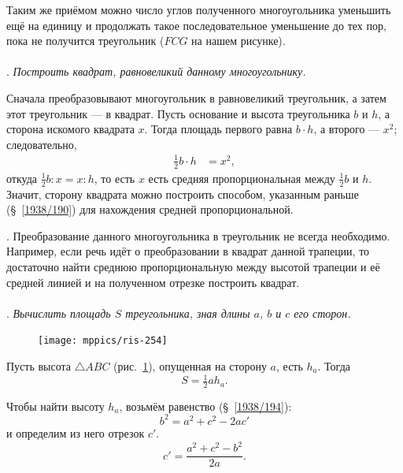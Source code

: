 \documentclass[oneside]{book}
\begin{document}
Таким же приёмом можно число углов полученного многоугольника уменьшить ещё на единицу и продолжать такое последовательное уменьшение до тех пор, пока не получится треугольник ($FCG$ на нашем рисунке).

\paragraph{}\label{1938/255}
.
\emph{Построить квадрат, равновеликий данному многоугольнику.}

Сначала преобразовывают многоугольник в равновеликий треугольник, а затем этот треугольник — в квадрат.
Пусть основание и высота треугольника $b$ и $h$, а сторона искомого квадрата $x$.
Тогда площадь первого равна $b\cdot h$, а второго — $x^2$; 
следовательно,
\begin{align*}
\tfrac12 b\cdot h&=x^2,
\end{align*}
откуда
$\frac12 b:{x}=x:h$,
то есть $x$ есть средняя пропорциональная между $\tfrac12 b$ и $h$.
Значит, сторону квадрата можно построить способом, указанным раньше (§~\ref{1938/190}) для нахождения средней пропорциональной.

\smallskip
{}.
Преобразование данного многоугольника в треугольник не всегда необходимо.
Например, если речь идёт о преобразовании в квадрат данной трапеции, то достаточно найти среднюю пропорциональную между высотой трапеции и её средней линией и на полученном отрезке построить квадрат.

\paragraph{}\label{1938/256}
.
\emph{Вычислить площадь $S$ треугольника, зная длины $a$, $b$ и $c$ его сторон.}

\begin{figure}
\centering
\texttt{[image: mppics/ris-254]}
\caption{}\label{1938/ris-254}
\end{figure}

Пусть высота $\triangle ABC$ (рис.~\ref{1938/ris-254}), опущенная на сторону $a$, есть $h_a$.
Тогда
\[S=\tfrac12ah_a.\]

Чтобы найти высоту $h_a$, возьмём равенство (§~\ref{1938/194}):
\[b^2 =  a^2+c^2 -2ac'\]
и определим из него отрезок $c'$.
\[c'=\frac{a^2+c^2-b^2}{2a}.\]
\end{document}

